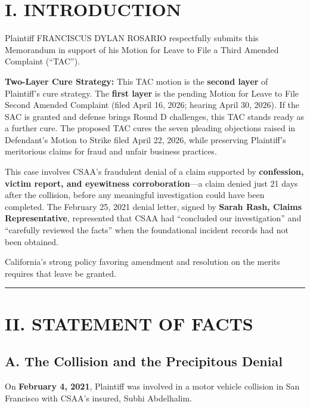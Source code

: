 \section{I. INTRODUCTION}\label{i.-introduction}

Plaintiff FRANCISCUS DYLAN ROSARIO respectfully submits this Memorandum in support of his Motion for Leave to File a Third Amended Complaint (``TAC'').

\textbf{Two-Layer Cure Strategy:} This TAC motion is the \textbf{second layer} of Plaintiff's cure strategy. The \textbf{first layer} is the pending Motion for Leave to File Second Amended Complaint (filed April 16, 2026; hearing April 30, 2026). If the SAC is granted and defense brings Round D challenges, this TAC stands ready as a further cure. The proposed TAC cures the seven pleading objections raised in Defendant's Motion to Strike filed April 22, 2026, while preserving Plaintiff's meritorious claims for fraud and unfair business practices.

This case involves CSAA's fraudulent denial of a claim supported by \textbf{confession, victim report, and eyewitness corroboration}---a claim denied just 21 days after the collision, before any meaningful investigation could have been completed. The February 25, 2021 denial letter, signed by \textbf{Sarah Rash, Claims Representative}, represented that CSAA had ``concluded our investigation'' and ``carefully reviewed the facts'' when the foundational incident records had not been obtained.

California's strong policy favoring amendment and resolution on the merits requires that leave be granted.

\begin{center}\rule{0.5\linewidth}{0.5pt}\end{center}

\label{toc:ii-statement-of-facts}
\section{II. STATEMENT OF FACTS}\label{ii.-statement-of-facts}

\subsection{A. The Collision and the Precipitous Denial}\label{a.-the-collision-and-the-precipitous-denial}

On \textbf{February 4, 2021}, Plaintiff was involved in a motor vehicle collision in San Francisco with CSAA's insured, Subhi Abdelhalim.

